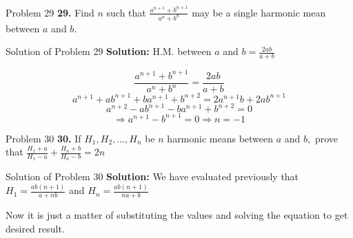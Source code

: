 \documentclass[aspectratio=1610,8pt]{beamer}
\begin{document}
\begin{frame}{Problem 29}
  \textbf{29.} Find $n$ such that $\frac{a^{n + 1} + b^{n + 1}}{a^n + b^n}$ may
  be a single harmonic mean between $a$ and $b.$
\end{frame}
\begin{frame}{Solution of Problem 29}
  \textbf{Solution:} H.M. between $a$ and $b = \frac{2ab}{a + b}$

  $$\frac{a^{n + 1} + b^{n + 1}}{a^n + b^n} = \frac{2ab}{a + b}$$
  $$a^{n + 1} + ab^{n + 1} + ba^{n + 1} + b^{n+ 2} = 2a^{n + 1}b + 2ab^{n +
    1}$$
  $$a^{n + 2} - ab^{n + 1} - ba^{n + 1} + b^{n + 2} = 0$$
  $$\Rightarrow a^{n + 1} - b^{n + 1} = 0 \Rightarrow n = -1$$
\end{frame}
\begin{frame}{Problem 30}
  \textbf{30.} If $H_1, H_2, \ldots, H_n$ be $n$ harmonic means between $a$ and
  $b,$ prove that $\frac{H_1 + a}{H_1 - a} + \frac{H_n + b}{H_n - b} = 2n$
\end{frame}
\begin{frame}{Solution of Problem 30}
  \textbf{Solution:} We have evaluated previously that $H_1 = \frac{ab(n +
    1)}{a + nb}$ and $H_n = \frac{ab(n + 1)}{na + b}$

  Now it is just a matter of substituting the values and solving the equation
  to get desired result.
\end{frame}
\end{document}
